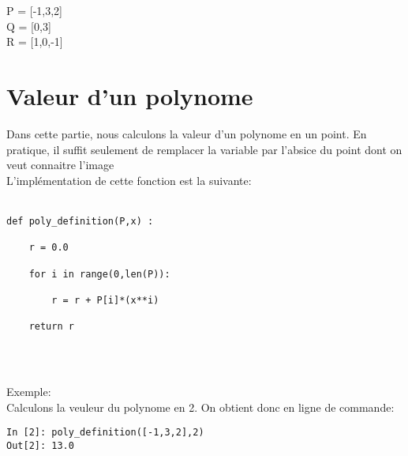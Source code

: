 \documentclass{exam}
\newenvironment{DDbox}[1]{
\begin{lrbox}{\BBbox}\begin{minipage}{\linewidth}}
{\end{minipage}\end{lrbox}\noindent\colorbox{Zgris}{\usebox{\BBbox}} \\
[.5cm]}
\begin{document}
\noindent P = [-1,3,2]\\
Q = [0,3]\\
R = [1,0,-1]\\


\section{Valeur d'un polynome}
\indent Dans cette partie, nous calculons la valeur d'un polynome en un point. En pratique, il suffit seulement de remplacer la variable par l'absice du point dont on veut connaitre l'image\\
L'implémentation de cette fonction est la suivante:\\\\


\begin{DDbox}{\linewidth}
\begin{Verbatim}
def poly_definition(P,x) :
	
	r = 0.0
	
	for i in range(0,len(P)):
		
		r = r + P[i]*(x**i)
	
	return r
	 
\end{Verbatim}
\end{DDbox}

Exemple: \\
Calculons la veuleur du polynome en 2. On obtient donc en ligne de commande:\\

\begin{DDbox}{\linewidth}
\begin{Verbatim}
In [2]: poly_definition([-1,3,2],2)
Out[2]: 13.0
\end{Verbatim}
\end{DDbox}
\end{document}
